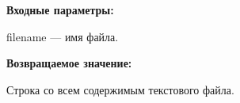 \textbf{Входные параметры:}

filename --- имя файла.

\textbf{Возвращаемое значение:}

Строка со всем содержимым текстового файла.
